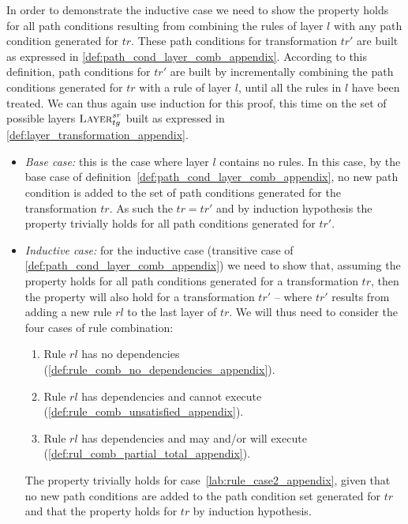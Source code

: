 \begin{pf}
In order to demonstrate the inductive case we need to show the property holds for all path conditions resulting from combining the rules of layer $l$ with any path condition generated for $tr$. These path conditions for transformation $tr'$ are built as expressed in \cref{def:path_cond_layer_comb_appendix}. According to this definition, path conditions for $tr'$ are built by incrementally combining the path conditions generated for $tr$ with a rule of layer $l$, until all the rules in $l$ have been treated. We can thus again use induction for this proof, this time on the set of possible layers $\textsc{Layer}^{sr}_{tg}$ built as expressed in \cref{def:layer_transformation_appendix}. 

\begin{itemize}
  \item \emph{Base case:} this is the case where layer $l$ contains no rules. In this case, by the base case of definition~\ref{def:path_cond_layer_comb_appendix}, no new path condition is added to the set of path conditions generated for the transformation $tr$. As such the $tr=tr'$ and by induction hypothesis the property trivially holds for all path conditions generated for $tr'$.
  
  \item \emph{Inductive case:} for the inductive case (transitive case of \cref{def:path_cond_layer_comb_appendix}) we need to show that, assuming the property holds for all path conditions generated for a transformation $tr$, then the property will also hold for a transformation $tr'$ -- where $tr'$ results from adding a new rule $rl$ to the last layer of $tr$. We will thus need to consider the four cases of rule combination:\vspace{.2cm} 
 
\begin{enumerate}
\item\label{lab:rule_case1_appendix} Rule $rl$ has no dependencies (\cref{def:rule_comb_no_dependencies_appendix}).
\item\label{lab:rule_case2_appendix} Rule $rl$ has dependencies and cannot execute (\cref{def:rule_comb_unsatisfied_appendix}).
\item\label{lab:rule_case3_appendix} Rule $rl$ has dependencies and may and/or will execute (\cref{def:rul_comb_partial_total_appendix}).
\end{enumerate}

The property trivially holds for case~\ref{lab:rule_case2_appendix}, given that no new path conditions are added to the path condition set generated for $tr$ and that the property holds for $tr$ by induction hypothesis.


\end{itemize}
\end{pf}
